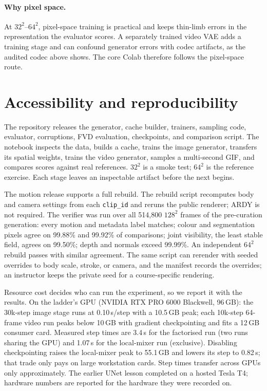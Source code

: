\documentclass[10pt,twocolumn]{article}
\begin{document}
\paragraph{Why pixel space.} At $32^2$--$64^2$, pixel-space training is practical and keeps thin-limb errors in
the representation the evaluator scores. A separately trained video VAE adds a training stage and can confound
generator errors with codec artifacts, as the audited codec above shows. The core Colab therefore follows the
pixel-space route.

\section{Accessibility and reproducibility}
The repository releases the generator, cache builder, trainers, sampling code, evaluator, corruptions, FVD
evaluation, checkpoints, and comparison script. The notebook inspects the data, builds a cache, trains the
image generator, transfers its spatial weights, trains the video generator, samples a multi-second GIF, and
compares scores against real references. $32^2$ is a smoke test; $64^2$ is the reference exercise. Each stage
leaves an inspectable artifact before the next begins.

The motion release supports a full rebuild. The rebuild script recomputes body and camera settings from each
\texttt{clip\_id} and reruns the public renderer; ARDY is not required. The verifier was run over all 514,800
$128^2$ frames of the pre-curation generation: every motion and metadata label matches; colour and segmentation
pixels agree on 99.88\% and 99.92\% of comparisons; joint visibility, the least stable field, agrees on
99.50\%; depth and normals exceed 99.99\%. An independent $64^2$ rebuild passes with similar agreement. The
same script can rerender with seeded overrides to body scale, stroke, or camera, and the manifest records the
overrides; an instructor keeps the private seed for a course-specific rendering.

Resource cost decides who can run the experiment, so we report it with the results. On the ladder's GPU
(NVIDIA RTX PRO 6000 Blackwell, 96\,GB): the 30k-step image stage runs at 0.10\,s/step with a 10.5\,GB peak;
each 10k-step 64-frame video run peaks below 10\,GB with gradient checkpointing and fits a 12\,GB consumer
card. Measured step times are 3.4\,s for the factorised run (two runs sharing the GPU) and 1.07\,s for the
local-mixer run (exclusive). Disabling checkpointing raises the local-mixer peak to 55.1\,GB and lowers its
step to 0.82\,s; that trade only pays on large workstation cards. Step times transfer across GPUs only
approximately. The earlier UNet lesson completed on a hosted Tesla T4; hardware numbers are reported for the
hardware they were recorded on.
\end{document}
